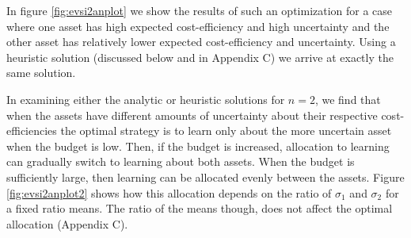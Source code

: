 \documentclass[]{article}
\theoremstyle{definition}
\theoremstyle{definition}
\theoremstyle{remark}
\begin{document}
In figure \ref{fig:evsi2anplot} we show the results of such an
optimization for a case where one asset has high expected
cost-efficiency and high uncertainty and the other asset has relatively
lower expected cost-efficiency and uncertainty. Using a heuristic
solution (discussed below and in Appendix C) we arrive at exactly the
same solution.

In examining either the analytic or heuristic solutions for \(n = 2\),
we find that when the assets have different amounts of uncertainty about
their respective cost-efficiencies the optimal strategy is to learn only
about the more uncertain asset when the budget is low. Then, if the
budget is increased, allocation to learning can gradually switch to
learning about both assets. When the budget is sufficiently large, then
learning can be allocated evenly between the assets. Figure
\ref{fig:evsi2anplot2} shows how this allocation depends on the ratio of
\(\sigma_1\) and \(\sigma_2\) for a fixed ratio means. The ratio of the
means though, does not affect the optimal allocation (Appendix C).
\end{document}
